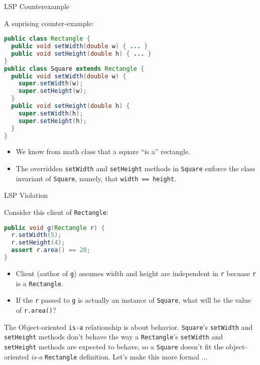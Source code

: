 \documentclass{beamer}
\begin{document}
\begin{frame}[fragile]{LSP Counterexample}

A suprising counter-example:
\vspace{-.05in}
\begin{lstlisting}[language=Java]
public class Rectangle {
  public void setWidth(double w) { ... }
  public void setHeight(double h) { ... }
}
public class Square extends Rectangle {
  public void setWidth(double w) {
    super.setWidth(w);
    super.setHeight(w);
  }
  public void setHeight(double h) {
    super.setWidth(h);
    super.setHeight(h);
  }
}
\end{lstlisting}
\vspace{-.1in}
\begin{itemize}
\item We know from math class that a square ``is a'' rectangle.
\item The overridden {\tt setWidth} and {\tt setHeight} methods in {\tt Square} enforce the class invariant of {\tt Square}, namely, that {\tt width == height}.
\end{itemize}


\end{frame}

\begin{frame}[fragile]{LSP Violation}


Consider this client of {\tt Rectangle}:
\begin{lstlisting}[language=Java]
public void g(Rectangle r) {
  r.setWidth(5);
  r.setHeight(4);
  assert r.area() == 20;
}
\end{lstlisting}

\begin{itemize}
\item Client (author of {\tt g}) assumes width and height are independent in {\tt r} becuase {\tt r} is a {\tt Rectangle}.
\item If the {\tt r} passed to {\tt g} is actually an instance of {\tt Square}, what will be the value of {\tt r.area()}?
\end{itemize}
The Object-oriented {\tt is-a} relationship is about behavior.  {\tt Square}'s {\tt setWidth} and {\tt setHeight} methods don't behave the way a {\tt Rectangle}'s {\tt setWidth} and {\tt setHeight} methods are expected to behave, so a {\tt Square} doesn't fit the object-oriented {\it is-a} {\tt Rectangle} definition.  Let's make this more formal ...

\end{frame}
\end{document}

